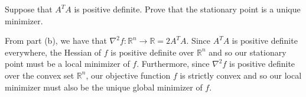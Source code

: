 Suppose that $A^T A$ is positive definite. Prove that the stationary point is a unique minimizer.

\begin{solution}
  From part (b), we have that $\nabla^2 f: \mathbb{R}^n \to \mathbb{R} = 2 A^T A$. Since $A^T A$ is positive definite 
  everywhere, the Hessian of $f$ is positive definite over $\mathbb{R}^n$ and so our stationary point must be a local 
  minimizer of $f$. Furthermore, since $\nabla^2 f$ is positive definite over the convex set $\mathbb{R}^n$, our 
  objective function $f$ is strictly convex and so our local minimizer must also be the unique global minimizer of $f$.
  \ \\
\end{solution}
